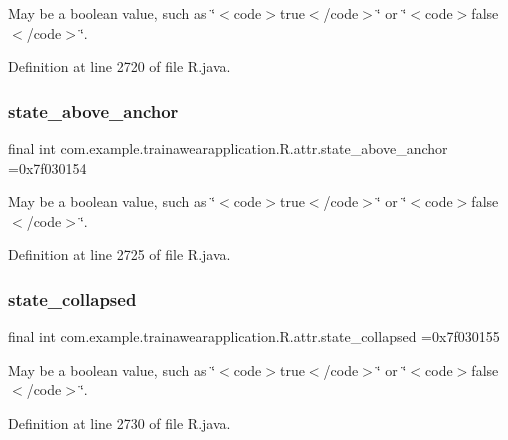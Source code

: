 May be a boolean value, such as \char`\"{}$<$code$>$true$<$/code$>$\char`\"{} or \char`\"{}$<$code$>$false$<$/code$>$\char`\"{}. 

Definition at line 2720 of file R.\+java.

\mbox{\label{classcom_1_1example_1_1trainawearapplication_1_1_r_1_1attr_ad05ba3bebeba2ae8099070185cac3cd8}} 
\subsubsection{\texorpdfstring{state\_above\_anchor}{state\_above\_anchor}}
{\footnotesize\ttfamily final int com.\+example.\+trainawearapplication.\+R.\+attr.\+state\+\_\+above\+\_\+anchor =0x7f030154\hspace{0.3cm}{\ttfamily [static]}}

May be a boolean value, such as \char`\"{}$<$code$>$true$<$/code$>$\char`\"{} or \char`\"{}$<$code$>$false$<$/code$>$\char`\"{}. 

Definition at line 2725 of file R.\+java.

\mbox{\label{classcom_1_1example_1_1trainawearapplication_1_1_r_1_1attr_ad73414fe24d691a78d355552b068aefa}} 
\subsubsection{\texorpdfstring{state\_collapsed}{state\_collapsed}}
{\footnotesize\ttfamily final int com.\+example.\+trainawearapplication.\+R.\+attr.\+state\+\_\+collapsed =0x7f030155\hspace{0.3cm}{\ttfamily [static]}}

May be a boolean value, such as \char`\"{}$<$code$>$true$<$/code$>$\char`\"{} or \char`\"{}$<$code$>$false$<$/code$>$\char`\"{}. 

Definition at line 2730 of file R.\+java.

